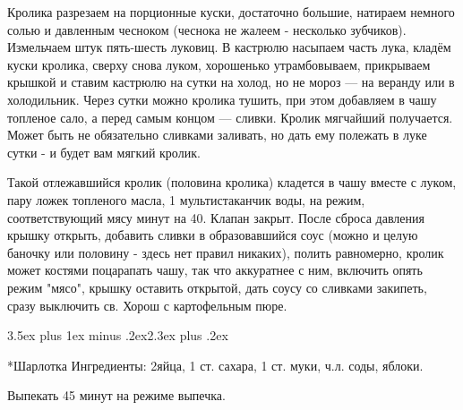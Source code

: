 \documentclass[a4paper]{report}
\makeatletter
\renewcommand{\section}{\@startsection{section}{1}{18pt}%
{3.5ex plus 1ex minus .2ex}{2.3ex plus .2ex}%
{\normalfont\Large\bfseries\raggedright}}%
\makeatother
\begin{document}
Кролика разрезаем на порционные куски, достаточно большие, натираем немного солью и давленным чесноком (чеснока не жалеем - несколько зубчиков). Измельчаем штук пять-шесть луковиц. В кастрюлю насыпаем часть лука, кладём куски кролика, сверху снова луком, хорошенько утрамбовываем, прикрываем крышкой и ставим кастрюлю на сутки на холод, но не мороз --- на веранду или в холодильник. Через сутки можно кролика тушить, при этом добавляем в чашу топленое сало, а перед самым концом --- сливки. Кролик мягчайший получается. Может быть не обязательно сливками заливать, но дать ему полежать в луке сутки - и будет вам мягкий кролик.

Такой отлежавшийся кролик (половина кролика) кладется в чашу вместе с луком, пару ложек топленого масла, 1 мультистаканчик воды, на режим, соответствующий мясу минут на 40. Клапан закрыт. После сброса давления крышку открыть, добавить сливки в образовавшийся соус (можно и целую баночку или половину - здесь нет правил никаких), полить равномерно, кролик может костями поцарапать чашу, так что аккуратнее с ним, включить опять режим "мясо", крышку оставить открытой, дать соусу со сливками закипеть, сразу выключить св. Хорош с картофельным пюре.

\section*{Шарлотка}
Ингредиенты: 2яйца, 1 ст. сахара, 1 ст. муки, ч.л. соды, яблоки. 

Выпекать 45 минут на режиме выпечка.
\end{document}
